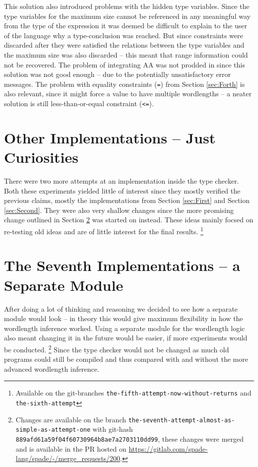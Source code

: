 This solution also introduced problems with the hidden type variables. Since the type variables for the maximum size cannot be referenced in any meaningful way from the type of the expression it was deemed be difficult to explain to the user of the language why a type-conclusion was reached. But since constraints were discarded after they were satisfied the relations between the type variables and the maximum size was also discarded -- this meant that range information could not be recovered. The problem of integrating AA was not prodded in since this solution was not good enough -- due to the potentially unsatisfactory error messages. The problem with equality constraints (\verb+=+) from Section \ref{sec:Forth} is also relevant, since it might force a value to have multiple wordlengths -- a neater solution is still less-than-or-equal constraint (\verb+<=+).

\section{Other Implementations -- Just Curiosities}
\label{sec:Other}

There were two more attempts at an implementation inside the type checker. Both these experiments yielded little of interest since they mostly verified the previous claims, mostly the implementations from Section \ref{sec:First} and Section \ref{sec:Second}. They were also very shallow changes since the more promising change outlined in Section \ref{sec:Seven} was started on instead. These ideas mainly focsed on re-testing old ideas and are of little interest for the final results.
\cprotect\footnote{Available on the git-branches \verb+the-fifth-attempt-now-without-returns+ and \verb+the-sixth-attempt+}


\section{The Seventh Implementations -- a Separate Module}
\label{sec:Seven}
After doing a lot of thinking and reasoning we decided to see how a separate module would look -- in theory this would give maximum flexibility in how the wordlength inference worked. Using a separate module for the wordlength logic also meant changing it in the future would be easier, if more experiments would be conducted.%
\cprotect\footnote{Changes are available on the branch \verb+the-seventh-attempt-almost-as-simple-as-attempt-one+ with git-hash \verb+889afd61a59f04f60730964b8ae7a2703110dd99+, these changes were merged and is available in the PR hosted on \url{https://gitlab.com/spade-lang/spade/-/merge_requests/200}.}%
Since the type checker would not be changed as much old programs could still be compiled and thus compared with and without the more advanced wordlength inference.%

